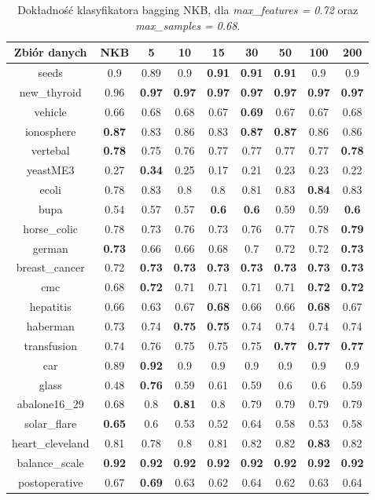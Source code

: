 \begin{table}[H]
\begin{center}
{\begin{tabular}{c|cccccccc}
				Zbiór danych&NKB&5&10&15&30&50&100&200\\%
				\hline%
				seeds&0.9&0.89&0.9&\textbf{0.91}&\textbf{0.91}&\textbf{0.91}&0.9&0.9\\%
				new\_thyroid&0.96&\textbf{0.97}&\textbf{0.97}&\textbf{0.97}&\textbf{0.97}&\textbf{0.97}&\textbf{0.97}&\textbf{0.97}\\%
				vehicle&0.66&0.68&0.68&0.67&\textbf{0.69}&0.67&0.67&0.68\\%
				ionosphere&\textbf{0.87}&0.83&0.86&0.83&\textbf{0.87}&\textbf{0.87}&0.86&0.86\\%
				vertebal&\textbf{0.78}&0.75&0.76&0.77&0.77&0.77&0.77&\textbf{0.78}\\%
				yeastME3&0.27&\textbf{0.34}&0.25&0.17&0.21&0.23&0.23&0.22\\%
				ecoli&0.78&0.83&0.8&0.8&0.81&0.83&\textbf{0.84}&0.83\\%
				bupa&0.54&0.57&0.57&\textbf{0.6}&\textbf{0.6}&0.59&0.59&\textbf{0.6}\\%
				horse\_colic&0.78&0.73&0.76&0.73&0.76&0.77&0.78&\textbf{0.79}\\%
				german&\textbf{0.73}&0.66&0.66&0.68&0.7&0.72&0.72&\textbf{0.73}\\%
				breast\_cancer&0.72&\textbf{0.73}&\textbf{0.73}&\textbf{0.73}&\textbf{0.73}&\textbf{0.73}&\textbf{0.73}&\textbf{0.73}\\%
				cmc&0.68&\textbf{0.72}&0.71&0.71&0.71&0.71&\textbf{0.72}&\textbf{0.72}\\%
				hepatitis&0.66&0.63&0.67&\textbf{0.68}&0.66&0.66&\textbf{0.68}&0.67\\%
				haberman&0.73&0.74&\textbf{0.75}&\textbf{0.75}&0.74&0.74&0.74&0.74\\%
				transfusion&0.74&0.76&0.75&0.75&0.75&\textbf{0.77}&\textbf{0.77}&\textbf{0.77}\\%
				car&0.89&\textbf{0.92}&0.9&0.9&0.9&0.9&0.9&0.9\\%
				glass&0.48&\textbf{0.76}&0.59&0.61&0.59&0.6&0.6&0.59\\%
				abalone16\_29&0.68&0.8&\textbf{0.81}&0.8&0.79&0.79&0.79&0.79\\%
				solar\_flare&\textbf{0.65}&0.6&0.53&0.52&0.64&0.58&0.53&0.58\\%
				heart\_cleveland&0.81&0.78&0.8&0.81&0.82&0.82&\textbf{0.83}&0.82\\%
				balance\_scale&\textbf{0.92}&\textbf{0.92}&\textbf{0.92}&\textbf{0.92}&\textbf{0.92}&\textbf{0.92}&\textbf{0.92}&\textbf{0.92}\\%
				postoperative&0.67&\textbf{0.69}&0.63&0.62&0.64&0.62&0.63&0.64\\%
				\end{tabular}}
			\caption{Dokładność klasyfikatora bagging NKB, dla \textit{max\_features = 0.72} oraz \textit{max\_samples = 0.68}.}
			\label{bagging_acc2}
		\end{center}
	\end{table}
